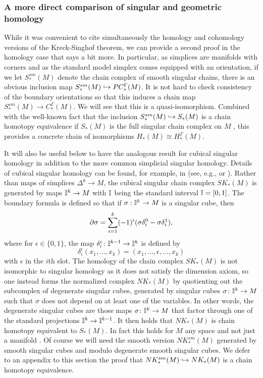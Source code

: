 \subsubsection{A more direct comparison of singular and geometric homology}

While it was convenient to cite simultaneously the homology and cohomology versions of the Kreck-Singhof theorem, we can provide a second proof in the homology case that says a bit more.
In particular, as simplices are manifolds with corners and as the standard model simplex comes equipped with an orientation, if we let $S^{sm}_*(M)$ denote the chain complex of smooth singular chains, there is an obvious inclusion map $S^{sm}_*(M) \hookrightarrow PC_*^\Gamma(M)$.
It is not hard to check consistency of the boundary orientations so that this induces a chain map $S^{sm}_*(M) \to C_*^\Gamma(M)$.
We will see that this is a quasi-isomorphism.
Combined with the well-known fact that the inclusion $S^{sm}_*(M) \hookrightarrow S_*(M)$ is a chain homotopy equivalence if $S_*(M)$ is the full singular chain complex on $M$ \cite[Theorem 18.7]{Lee13}, this provides a concrete chain of isomorphisms $H_*(M) \cong H_*^\Gamma(M)$.

It will also be useful below to have the analogous result for cubical singular homology in addition to the more common simplicial singular homology.
Details of cubical singular homology can be found, for example, in (see, e.g., \cite{Mas91} or \cite[Section 8.3]{HW60}).
Rather than maps of simplices $\Delta^k \to M$, the cubical singular chain complex $SK_*(M)$ is generated by maps $\mathbb{I}^k \to M$ with $\mathbb{I}$ being the standard interval $\mathbb{I} = [0,1]$.
The boundary formula is defined so that if $\sigma: \mathbb{I}^k \to M$ is a singular cube, then
\begin{equation}\label{E: cube bd}
	\partial \sigma = \sum_{i = 1}^k (-1)^i(\sigma \delta_i^0-\sigma \delta^1_i),
\end{equation}
where for $\epsilon\in\{0,1\}$, the map $\delta_i^\epsilon \colon \mathbb{I}^{k-1} \to \mathbb{I}^k$ is defined by
$$\delta_i^\epsilon(x_1,\ldots,x_k) = (x_1,\ldots,\epsilon,\ldots, x_k)$$
with $\epsilon$ in the $i$th slot.
The homology of the chain complex $SK_*(M)$ is not isomorphic to singular homology as it does not satisfy the dimension axiom, so one instead forms the normalized complex $NK_*(M)$ by quotienting out the subcomplex of degenerate singular cubes, generated by singular cubes $\sigma \colon \mathbb{I}^k \to M$ such that $\sigma$ does not depend on at least one of the variables.
In other words, the degenerate singular cubes are those maps $\sigma \colon \mathbb{I}^k \to M$ that factor through one of the standard projections $\mathbb{I}^k \to \mathbb{I}^{k-1}$.
It then holds that $NK_*(M)$ is chain homotopy equivalent to $S_*(M)$.
In fact this holds for $M$ any space and not just a manifold \cite[Theorem 8.4.7]{HW60}.
Of course we will need the smooth version $NK^{sm}_*(M)$ generated by smooth singular cubes and modulo degenerate smooth singular cubes.
We defer to an appendix to this section the proof that $NK^{sm}_*(M) \hookrightarrow NK_*(M)$ is a chain homotopy equivalence.

